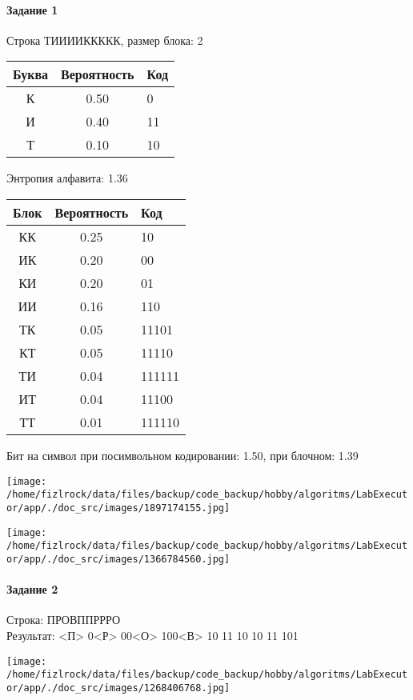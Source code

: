 \documentclass[a4paper, 12pt]{article}
\begin{document}
\paragraph{Задание 1}

Строка ТИИИИККККК, размер блока: 2
\begin{center}
 \begin{tabular}{ |c|c|l| } 
  \hline
     Буква & Вероятность & Код\\ \hline
К & 0.50 & 0\\\hline
И & 0.40 & 11\\\hline
Т & 0.10 & 10
\\ \hline \end{tabular}
\end{center}
Энтропия алфавита: 1.36
\begin{center}
 \begin{tabular}{ |c|c|l| } 
  \hline
     Блок & Вероятность & Код\\ \hline
КК & 0.25 & 10\\\hline
ИК & 0.20 & 00\\\hline
КИ & 0.20 & 01\\\hline
ИИ & 0.16 & 110\\\hline
ТК & 0.05 & 11101\\\hline
КТ & 0.05 & 11110\\\hline
ТИ & 0.04 & 111111\\\hline
ИТ & 0.04 & 11100\\\hline
ТТ & 0.01 & 111110
\\ \hline \end{tabular}
\end{center}
Бит на символ при посимвольном кодировании: 1.50, при блочном: 1.39

\texttt{[image: /home/fizlrock/data/files/backup/code\_backup/hobby/algoritms/LabExecutor/app/./doc\_src/images/1897174155.jpg]}

\texttt{[image: /home/fizlrock/data/files/backup/code\_backup/hobby/algoritms/LabExecutor/app/./doc\_src/images/1366784560.jpg]}
\pagebreak
\paragraph{Задание 2}

Строка: 
ПРОВППРРРО\\
Результат: <П> 0<Р> 00<О> 100<В> 10 11 10 10 11 101

\texttt{[image: /home/fizlrock/data/files/backup/code\_backup/hobby/algoritms/LabExecutor/app/./doc\_src/images/1268406768.jpg]}
\end{document}
